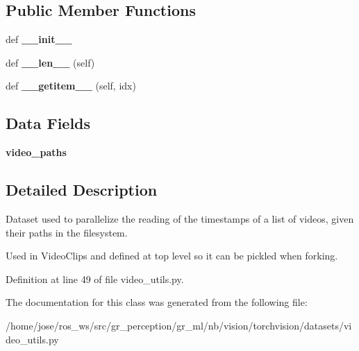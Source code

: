 \subsection*{Public Member Functions}
\begin{DoxyCompactItemize}
\item 
\mbox{\label{classtorchvision_1_1datasets_1_1video__utils_1_1__VideoTimestampsDataset_a19c146e81600b707068335da1e2931cb}} 
def {\bfseries \+\_\+\+\_\+init\+\_\+\+\_\+}
\item 
\mbox{\label{classtorchvision_1_1datasets_1_1video__utils_1_1__VideoTimestampsDataset_af64c9729e5cb806988f971d46aee9d9c}} 
def {\bfseries \+\_\+\+\_\+len\+\_\+\+\_\+} (self)
\item 
\mbox{\label{classtorchvision_1_1datasets_1_1video__utils_1_1__VideoTimestampsDataset_a094e4540bf893da8e4003efd8f62a1f7}} 
def {\bfseries \+\_\+\+\_\+getitem\+\_\+\+\_\+} (self, idx)
\end{DoxyCompactItemize}
\subsection*{Data Fields}
\begin{DoxyCompactItemize}
\item 
\mbox{\label{classtorchvision_1_1datasets_1_1video__utils_1_1__VideoTimestampsDataset_a840a98a4601de8bcdcf5def269306949}} 
{\bfseries video\+\_\+paths}
\end{DoxyCompactItemize}


\subsection{Detailed Description}
\begin{DoxyVerb}Dataset used to parallelize the reading of the timestamps
of a list of videos, given their paths in the filesystem.

Used in VideoClips and defined at top level so it can be
pickled when forking.
\end{DoxyVerb}
 

Definition at line 49 of file video\+\_\+utils.\+py.



The documentation for this class was generated from the following file\+:\begin{DoxyCompactItemize}
\item 
/home/jose/ros\+\_\+ws/src/gr\+\_\+perception/gr\+\_\+ml/nb/vision/torchvision/datasets/video\+\_\+utils.\+py\end{DoxyCompactItemize}
